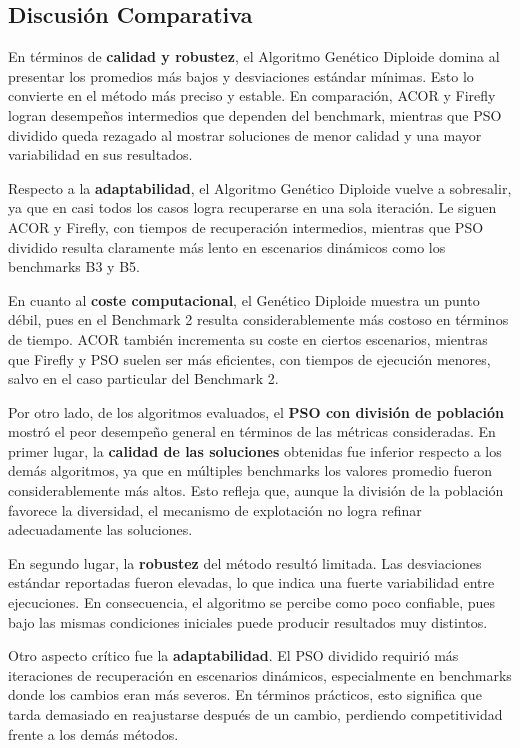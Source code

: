 \documentclass[10pt,twocolumn]{article}
\begin{document}
\subsection*{Discusión Comparativa}
En términos de \textbf{calidad y robustez}, el Algoritmo Genético Diploide domina al presentar los promedios más bajos y desviaciones estándar mínimas. Esto lo convierte en el método más preciso y estable. En comparación, ACOR y Firefly logran desempeños intermedios que dependen del benchmark, mientras que PSO dividido queda rezagado al mostrar soluciones de menor calidad y una mayor variabilidad en sus resultados.  

Respecto a la \textbf{adaptabilidad}, el Algoritmo Genético Diploide vuelve a sobresalir, ya que en casi todos los casos logra recuperarse en una sola iteración. Le siguen ACOR y Firefly, con tiempos de recuperación intermedios, mientras que PSO dividido resulta claramente más lento en escenarios dinámicos como los benchmarks B3 y B5.  

En cuanto al \textbf{coste computacional}, el Genético Diploide muestra un punto débil, pues en el Benchmark 2 resulta considerablemente más costoso en términos de tiempo. ACOR también incrementa su coste en ciertos escenarios, mientras que Firefly y PSO suelen ser más eficientes, con tiempos de ejecución menores, salvo en el caso particular del Benchmark 2.

Por otro lado, de los algoritmos evaluados, el \textbf{PSO con división de población} mostró el peor desempeño general en términos de las métricas consideradas. En primer lugar, la \textbf{calidad de las soluciones} obtenidas fue inferior respecto a los demás algoritmos, ya que en múltiples benchmarks los valores promedio fueron considerablemente más altos. Esto refleja que, aunque la división de la población favorece la diversidad, el mecanismo de explotación no logra refinar adecuadamente las soluciones.

En segundo lugar, la \textbf{robustez} del método resultó limitada. Las desviaciones estándar reportadas fueron elevadas, lo que indica una fuerte variabilidad entre ejecuciones. En consecuencia, el algoritmo se percibe como poco confiable, pues bajo las mismas condiciones iniciales puede producir resultados muy distintos.

Otro aspecto crítico fue la \textbf{adaptabilidad}. El PSO dividido requirió más iteraciones de recuperación en escenarios dinámicos, especialmente en benchmarks donde los cambios eran más severos. En términos prácticos, esto significa que tarda demasiado en reajustarse después de un cambio, perdiendo competitividad frente a los demás métodos.
\end{document}
